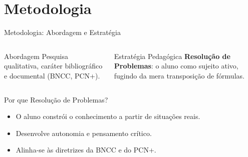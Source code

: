 \documentclass[10pt]{beamer}
\begin{document}
\section{Metodologia}

\begin{frame}{Metodologia: Abordagem e Estrat\'{e}gia}
\transdissolve 
\begin{columns}[T]
\begin{block}{Abordagem}
Pesquisa qualitativa, car\'{a}ter bibliogr\'{a}fico e documental (BNCC, PCN+).
\end{block}
\begin{block}{Estrat\'{e}gia Pedag\'{o}gica}
\textbf{Resolu\c{c}\~{a}o de Problemas}: o aluno como sujeito ativo, fugindo da mera transposi\c{c}\~{a}o de f\'{o}rmulas.
\end{block}
\end{columns}
\vspace{0.2cm}
\begin{alertblock}{Por que Resolu\c{c}\~{a}o de Problemas?}
\begin{itemize}
    \setlength{\itemsep}{0pt}
    \item O aluno constr\'{o}i o conhecimento a partir de situa\c{c}\~{o}es reais.
    \item Desenvolve autonomia e pensamento cr\'{i}tico.
    \item Alinha-se \`{a}s diretrizes da BNCC e do PCN+.
\end{itemize}
\end{alertblock}
\end{frame}
\end{document}
